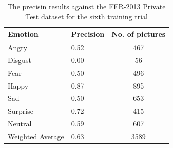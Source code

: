 \documentclass[runningheads,a4paper,11pt]{report}
\begin{document}
\begin{table}[htbp]
	\caption{The precisin results against the FER-2013 Private Test dataset for the sixth training trial}
	\label{fer_training_28k_01_squared_hinge_loss_private_test}
		\begin{center}
			\begin{tabular}{p{110pt}p{110pt}c}
				\textbf{Emotion}& \textbf{Precision}& \textbf{No. of pictures} \\
				\hline\hline
				Angry& 0.52& 467 \\
				Disgust& 0.00& 56 \\
				Fear& 0.50& 496 \\
				Happy& 0.87& 895 \\
				Sad& 0.50& 653 \\
				Surprise& 0.72& 415 \\
				Neutral& 0.59& 607 \\
				\hline
				Weighted Average& 0.63 &3589
			\end{tabular}
		\end{center}
\end{table}
\end{document}
